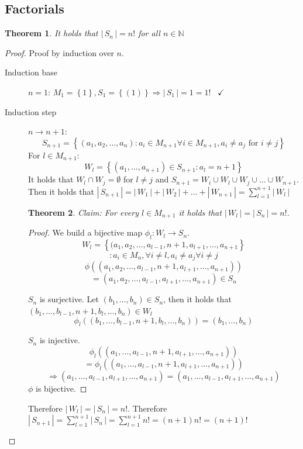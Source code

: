 \documentclass[a4paper,landscape,twocolumn]{article}
\newtheorem{theorem}{Theorem}
\newcommand\set[1]{\left\{#1\right\}}
\newcommand\card[1]{\left|\,#1\,\right|}
\newcommand\done{\hspace{10pt}\checkmark}
\begin{document}
\subsection{Factorials}
%
\begin{theorem}
  It holds that $\card{S_n} = n!$ for all $n \in \mathbb{N}$
\end{theorem}
\begin{proof}
  Proof by induction over $n$.
  \begin{description}
    \item[Induction base]
      $n=1$:
        $M_1 = \set{1}, S_1 = \set{(1)} \Rightarrow \card{S_1} = 1 = 1! \done$
    \item[Induction step]
      $n\rightarrow n+1$:
        \[
          S_{n+1} = \set{(a_1, a_2, \ldots, a_n) :
              a_i \in M_{n+1} \forall i \in M_{n+1},
              a_i \neq a_j \text{ for } i \neq j}
        \]
        For $l \in M_{n+1}$: \[
          W_l = \set{(a_1, \ldots, a_{n+1}) \in S_{n+1}: a_l = n+1}
        \]
        It holds that $W_l \cap W_j = \emptyset$ for $l \neq j$
        and $S_{n+1} = W_i \cup W_l \cup W_j \cup \ldots \cup W_{n+1}$.
        Then it holds that $\card{S_{n+1}} = \card{W_1} + \card{W_2} + \ldots + \card{W_{n+1}} = \sum_{l=1}^{n+1} \card{W_l}$

        \begin{theorem}
          Claim: For every $l \in M_{n+1}$ it holds that $\card{W_l} = \card{S_n} = n!$.
        \end{theorem}
        \begin{proof}
          We build a bijective map $\phi_l: W_l \rightarrow S_n$.
          \[
              W_l = \set{(a_1, a_2, \ldots, a_{l-1}, n+1, a_{l+1}, \ldots, a_{n+1}}
          \]\[
                  :a_i \in M_n, \forall i \neq l, a_i \neq a_j \forall i \neq j
          \] \[
              \phi\left((a_1, a_2, \ldots, a_{l-1}, n+1, a_{l+1}, \ldots, a_{n+1})\right)
          \] \[
                  = (a_1, a_2, \ldots, a_{l-1}, a_{l+1}, \ldots, a_{n+1}) \in S_n
          \]

          $S_n$ is surjective.
          Let $(b_1, \ldots, b_n) \in S_n$, then it holds that $(b_1, \ldots, b_{l-1}, n+1, b_l, \ldots, b_n) \in W_l$
          \[ \phi_l((b_1, \ldots, b_{l-1}, n+1, b_l, \ldots, b_n)) = (b_1, \ldots, b_n) \]

          $S_n$ is injective.
          \[
              \phi_l((a_1, \ldots, a_{l-1}, n+1, a_{l+1}, \ldots, a_{n+1}))
          \] \[
                  = \phi_l((a_1, \ldots, a_{l-1}, n+1, a_{l+1}, \dots, a_{n+1}))
          \] \[
               \Rightarrow
               (a_1, \ldots, a_{l-1}, a_{l+1}, \ldots, a_{n+1}) =
               (a_1, \ldots, a_{l-1}, a_{l+1}, \ldots, a_{n+1})
          \]
          $\phi$ is bijective.
        \end{proof}

        Therefore $\card{W_l} = \card{S_n} = n!$.
        Therefore $\card{S_{n+1}} = \sum_{l=1}^{n+1} \card{S_n} = \sum_{l=1}^{n+1} n! = (n + 1) n! = (n + 1)!$
  \end{description}
\end{proof}
\end{document}
